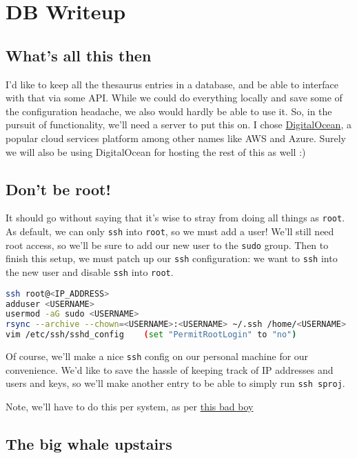 \documentclass[11pt, twoside, reqno]{book}
\begin{document}
\startmain
\chapter{DB Writeup}

\section{What's all this then}

I'd like to keep all the thesaurus entries in a database, and be able to interface with that via some API. While we could do everything locally and save some of the configuration headache, we also would hardly be able to use it. So, in the pursuit of functionality, we'll need a server to put this on. I chose \href{https://www.digitalocean.com}{DigitalOcean}, a popular cloud services platform among other names like AWS and Azure. Surely we will also be using DigitalOcean for hosting the rest of this as well :)

\section{Don't be root!}

It should go without saying that it's wise to stray from doing all things as \texttt{root}. As default, we can only \texttt{ssh} into \texttt{root}, so we must add a user! We'll still need root access, so we'll be sure to add our new user to the \texttt{sudo} group. Then to finish this setup, we must patch up our \texttt{ssh} configuration: we want to \texttt{ssh} into the new user and disable \texttt{ssh} into \texttt{root}.
\begin{lstlisting}[language=sh]
ssh root@<IP_ADDRESS>
adduser <USERNAME>
usermod -aG sudo <USERNAME> 
rsync --archive --chown=<USERNAME>:<USERNAME> ~/.ssh /home/<USERNAME> 
vim /etc/ssh/sshd_config    (set "PermitRootLogin" to "no")
\end{lstlisting}

Of course, we'll make a nice \texttt{ssh} config on our personal machine for our convenience. We'd like to save the hassle of keeping track of IP addresses and users and keys, so we'll make another entry to be able to simply run \texttt{ssh sproj}.

Note, we'll have to do this per system, as per \href{https://www.digitalocean.com/community/questions/error-permission-denied-publickey-when-i-try-to-ssh}{this bad boy}

\section{The big whale upstairs}
\end{document}
